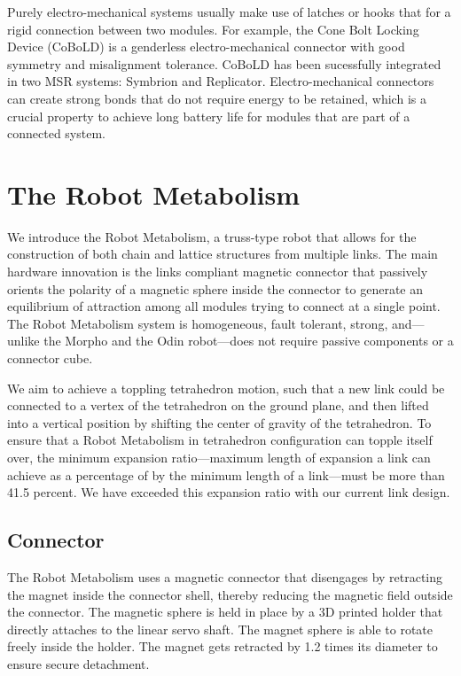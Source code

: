 \documentclass[letterpaper, 10 pt, conference]{ieeeconf}  %
\begin{document}
Purely electro-mechanical systems usually make use of latches or hooks that for a rigid connection between two modules. For example, the Cone Bolt Locking Device (CoBoLD) is a genderless electro-mechanical connector with good symmetry and misalignment tolerance\cite{Liedke2011}. CoBoLD has been sucessfully integrated in two MSR systems: Symbrion and Replicator\cite{Kernbach2008}. Electro-mechanical connectors can create strong bonds that do not require energy to be retained, which is a crucial property to achieve long battery life for modules that are part of a connected system.

\section{The Robot Metabolism}

We introduce the Robot Metabolism, a truss-type robot that allows for the construction of both chain and lattice structures from multiple links. The main hardware innovation is the links compliant magnetic connector that passively orients the polarity of a magnetic sphere inside the connector to generate an equilibrium of attraction among all modules trying to connect at a single point. The Robot Metabolism system is homogeneous, fault tolerant, strong, and---unlike the Morpho and the Odin robot---does not require passive components or a connector cube.

We aim to achieve a toppling tetrahedron motion, such that a new link could be connected to a vertex of the tetrahedron on the ground plane, and then lifted into a vertical position by shifting the center of gravity of the tetrahedron. To ensure that a Robot Metabolism in tetrahedron configuration can topple itself over, the minimum expansion ratio---maximum length of expansion a link can achieve as a percentage of by the minimum length of a link---must be more than 41.5 percent. We have exceeded this expansion ratio with our current link design.

\subsection{Connector}

The Robot Metabolism uses a magnetic connector that disengages by retracting the magnet inside the connector shell, thereby reducing the magnetic field outside the connector. The magnetic sphere is held in place by a 3D printed holder that directly attaches to the linear servo shaft. The magnet sphere is able to rotate freely inside the holder. The magnet gets retracted by 1.2 times its diameter to ensure secure detachment.
\end{document}
